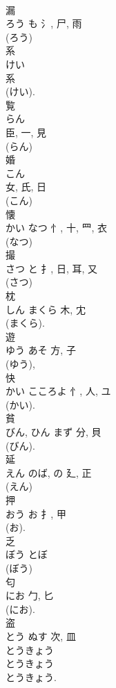 \documentclass[8pt]{extreport}
\begin{document}
\begin{CJK}{UTF8}{min}
\\	漏	
\\	ろう	も	氵, 尸, 雨	
\\	(ろう) 
\\	系	
\\	けい	
\\	系	
\\	(けい). 
\\	覧	
\\	らん	
\\	臣, 一, 見		
\\	(らん) 
\\	婚	
\\	こん	
\\	女, 氏, 日	
\\	(こん) 
\\	懐	
\\	かい	なつ	忄, 十, 罒, 衣	
\\	(なつ) 
\\	撮	
\\	さつ	と	扌, 日, 耳, 又	
\\	(さつ) 
\\	枕	
\\	しん	まくら	木, 冘	
\\	(まくら). 
\\	遊	
\\	ゆう	あそ	方, 子	
\\	(ゆう), 
\\	快	
\\	かい	こころよ	忄, 人, ユ	
\\	(かい). 
\\	貧	
\\	びん, ひん	まず	分, 貝	
\\	(びん). 
\\	延	
\\	えん	のば, の	廴, 正	
\\	(えん) 
\\	押	
\\	おう	お	扌, 甲	
\\	(お). 
\\	乏	
\\	ぼう	とぼ		
\\	(ぼう) 
\\	匂	
\\	にお	勹, 匕	
\\	(にお). 
\\	盗	
\\	とう	ぬす	次, 皿	
\\	とうきょう 
\\	とうきょう 
\\	とうきょう. 

\end{CJK}
\end{document}
